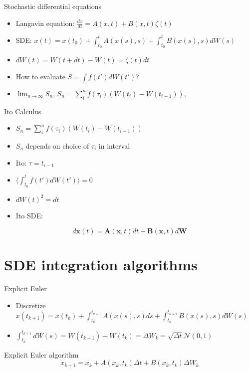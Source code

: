 \documentclass[]{beamer}
\newcommand {\be}{\begin{equation*}}
\newcommand {\ee}{\end{equation*}}
\newcommand{\expect}[1]{\langle#1\rangle}
\begin{document}
\begin{frame}{Stochastic differential equations}
\begin{itemize}
  \setlength\itemsep{1em}
 \item  Langavin equation: $\frac{d x}{dt}=A(x, t) +B(x, t)\zeta(t)$
\item SDE:  $x(t)=x(t_0)+\int_{t_0}^t A(x(s), s)+\int_{t_0}^t B(x(s), s) dW(s)$
\item $dW(t)=W(t+dt)-W(t)=\zeta(t)dt$
\item How to evaluate  $S=\int f(t')dW(t')$?
\item  $\lim_{n\to\infty}S_n$, \quad
$
S_n=\sum_i^n f(\tau_i)\left(W(t_i)-W(t_{i-1})\right),
$
\end{itemize}

\end{frame}


\begin{frame}{Ito Calculus}
\begin{itemize}
  \setlength\itemsep{1em}
 \item $S_n=\sum_i^n f(\tau_i)\left(W(t_i)-W(t_{i-1})\right)$
\item  $S_n$ depends on choice of $\tau_i$ in interval
\item Ito: $\tau=t_{i-1}$
\item $\expect{\int_{t_0}^t f(t')dW(t')}=0$
\item $dW(t)^2=dt $
\item Ito SDE: 
\end{itemize}
\be
d\mathbf{x}(t)=\mathbf{A}(\mathbf{x}, t)dt+\mathbf{B}(\mathbf{x}, t)d\mathbf{W}
\ee
\end{frame}

\section{SDE integration algorithms}
\begin{frame}{Explicit Euler}
\begin{itemize}
  \setlength\itemsep{1em}
 \item Discretize  $x(t_{k+1})=x(t_k)+\int_{t_k}^{t_{k+1}} A(x(s), s)ds+\int_{t_k}^{t_{k+1} } B(x(s), s) dW(s)$
\item $ \int_{t_k}^{t_{k+1}} dW(s)= W(t_{k+1})- W(t_{k})= \Delta W_k=\sqrt{\Delta t}\mathcal{N}(0,1)$
\end{itemize}
\begin{block}{Explicit Euler algorithm}
\be
 x_{k+1} = x_{k} + A(x_k, t_k)\Delta t +B(x_k, t_k) \Delta W_k
\ee

\end{block}
\end{frame}
\end{document}
